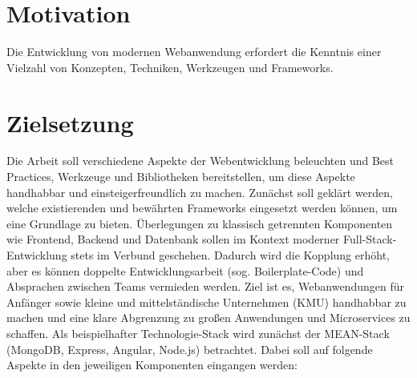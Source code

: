 
\section{Motivation}\label{sec:motivation}

Die Entwicklung von modernen Webanwendung erfordert die Kenntnis einer Vielzahl von Konzepten, Techniken, Werkzeugen und Frameworks.

\section{Zielsetzung}\label{sec:zielsetzung}

Die Arbeit soll verschiedene Aspekte der Webentwicklung beleuchten und Best Practices, Werkzeuge und Bibliotheken bereitstellen, um diese Aspekte handhabbar und einsteigerfreundlich zu machen.
Zunächst soll geklärt werden, welche existierenden und bewährten Frameworks eingesetzt werden können, um eine Grundlage zu bieten.
Überlegungen zu klassisch getrennten Komponenten wie Frontend, Backend und Datenbank sollen im Kontext moderner Full-Stack-Entwicklung stets im Verbund geschehen.
Dadurch wird die Kopplung erhöht, aber es können doppelte Entwicklungsarbeit (sog. Boilerplate-Code) und Absprachen zwischen Teams vermieden werden.
Ziel ist es, Webanwendungen für Anfänger sowie kleine und mittelständische Unternehmen (KMU) handhabbar zu machen und eine klare Abgrenzung zu großen Anwendungen und Microservices zu schaffen.
Als beispielhafter Technologie-Stack wird zunächst der MEAN-Stack (MongoDB, Express, Angular, Node.js) betrachtet.
Dabei soll auf folgende Aspekte in den jeweiligen Komponenten eingangen werden:

